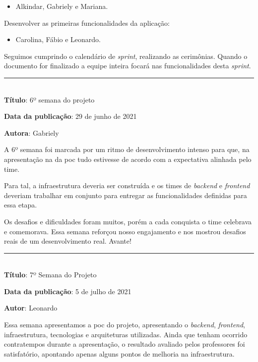 \begin{itemize}
			\item Alkindar, Gabriely e Mariana.
\end{itemize}

Desenvolver as primeiras funcionalidades da aplicação:

\begin{itemize}
			\item Carolina, Fábio e Leonardo.
\end{itemize}

Seguimos cumprindo o calendário de \textit{\gls{sprint}}, realizando as cerimônias. Quando o documento for finalizado a equipe inteira focará nas funcionalidades desta \textit{\gls{sprint}}.\\

\protect\rule{13cm}{.5pt}
\\

\textbf{Título}: 6º semana do projeto

\textbf{Data da publicação}: 29 de junho de 2021

\textbf{Autora}: Gabriely

 A 6º semana foi marcada por um ritmo de desenvolvimento intenso para que, na apresentação na da \gls{poc} tudo estivesse de acordo com a expectativa alinhada pelo time. 

Para tal, a infraestrutura deveria ser construída e os times de \textit{\gls{backend}} e \textit{\gls{frontend}} deveriam trabalhar em conjunto para entregar as funcionalidades definidas para essa etapa.

Os desafios e dificuldades foram muitos, porém a cada conquista o time celebrava e comemorava. Essa semana reforçou nosso engajamento e nos mostrou desafios reais de um desenvolvimento real. Avante! \\

\protect\rule{13cm}{.5pt}
\\

\textbf{Título}: 7º Semana do Projeto

\textbf{Data da publicação}: 5 de julho de 2021

\textbf{Autor}: Leonardo

Essa semana apresentamos a \gls{poc} do projeto, apresentando o \textit{\gls{backend}}, \textit{\gls{frontend}}, infraestrutura, tecnologias e arquiteturas utilizadas. Ainda que tenham ocorrido contratempos durante a apresentação, o resultado avaliado pelos professores foi satisfatório, apontando apenas alguns pontos de melhoria na infraestrutura.

